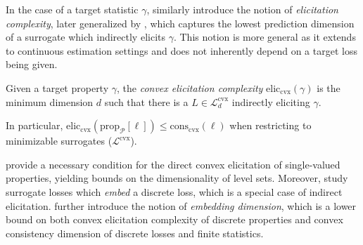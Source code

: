 \documentclass[anon,12pt]{colt2021} %
\newcommand{\Comments}{1}
\newcommand{\mytodo}[2]{\ifnum\Comments=1%
	\todo[linecolor=#1!80!black,backgroundcolor=#1,bordercolor=#1!80!black]{#2}\fi}
\newcommand{\btw}[1]{\mytodo{orange!80!white}{BTW: #1}}
\newcommand{\prop}[2][\mathcal{P}]{\mathrm{prop}_{#1}[#2]}
\newcommand{\eliccvx}{\mathrm{elic}_\mathrm{cvx}}
\newcommand{\conscvx}{\mathrm{cons}_\mathrm{cvx}}
\newcommand{\Lcvx}{\mathcal{L}^{\mathrm{cvx}}}
\begin{document}
In the case of a target statistic $\gamma$, \citet{lambert2008eliciting} similarly introduce the notion of \emph{elicitation complexity}, later generalized by \citet{frongillo2020elicitation}, which captures the lowest prediction dimension of a surrogate which indirectly elicits $\gamma$.
This notion is more general as it extends to continuous estimation settings and does not inherently depend on a target loss being given. 

\begin{definition}\label{def:cvx-elic-complex}
	Given a target property $\gamma$, the \emph{convex elicitation complexity} $\eliccvx(\gamma)$ is the minimum dimension $d$ such that there is a $L \in \Lcvx_d$ indirectly eliciting $\gamma$.
\end{definition}
In particular, $\eliccvx(\prop{\ell}) \leq \conscvx(\ell)$ when restricting to minimizable surrogates ($\Lcvx$).


\citet[Corollary 10]{agarwal2015consistent} provide a necessary condition for the direct convex elicitation of single-valued properties, yielding bounds on the dimensionality of level sets.
Moreover, \citet{finocchiaro2019embedding} study surrogate losses which \emph{embed} a discrete loss, which is a special case of indirect elicitation.
\citet{finocchiaro2020embedding} further introduce the notion of \emph{embedding dimension}, which is a lower bound on both convex elicitation complexity of discrete properties and convex consistency dimension of discrete losses and finite statistics.
\end{document}
